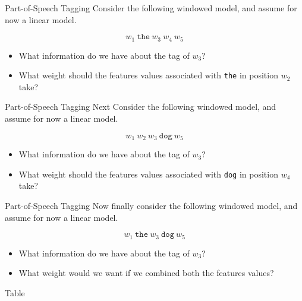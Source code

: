 \documentclass{beamer}
\begin{document}
\begin{frame}{Part-of-Speech Tagging}
  Consider the following windowed model, and 
  assume for now a linear model.

  \[w_1\ \mathrm{\texttt{the}}\ w_3\ w_4\ w_5\] 
  

  \begin{itemize}
  \item What information do we have about the tag of $w_3$?
    \air 

  \item What weight should the features values associated with
    \texttt{the} in position $w_2$ take?
  \end{itemize}
\end{frame}

\begin{frame}{Part-of-Speech Tagging}
  Next Consider the following windowed model, and 
  assume for now a linear model.

  \[w_1\ w_2 \ w_3\ \mathrm{\texttt{dog}} \ w_5\] 
  

  \begin{itemize}
  \item What information do we have about the tag of $w_3$?
    \air 

  \item What weight should the features values associated with
    \texttt{dog} in position $w_4$ take?
  \end{itemize}

\end{frame}


\begin{frame}{Part-of-Speech Tagging}
  Now finally consider the following windowed model, and 
  assume for now a linear model.

  \[w_1\ \texttt{the} \ w_3\ \mathrm{\texttt{dog}} \ w_5\] 
  

  \begin{itemize}
  \item What information do we have about the tag of $w_3$?
    \air 

  \item What weight would we want if we combined both the features values?
  \end{itemize}

\end{frame}

\begin{frame}{Table}
  
\end{frame}
\end{document}
